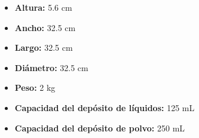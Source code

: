 \documentclass{article}
\begin{document}
\begin{adjustwidth}{2em}{}
\begin{itemize}
\begin{itemize}
    \item \textbf {Altura:} 5.6 cm
    \item \textbf {Ancho:} 32.5 cm
    \item \textbf {Largo:} 32.5 cm
    \item \textbf {Diámetro:} 32.5 cm
    \item \textbf {Peso:} 2 kg
    \item \textbf {Capacidad del depósito de líquidos:} 125 mL
    \item \textbf {Capacidad del depósito de polvo:} 250 mL
        \end{itemize}
    \end{itemize}

    \vspace{1\baselineskip} %
    \end{adjustwidth}
\end{document}
